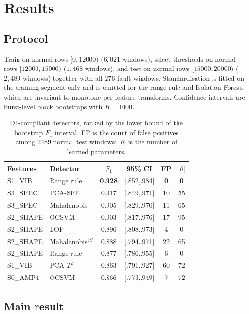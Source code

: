\documentclass[twocolumn,10pt]{article}
\begin{document}
\section{Results}
\label{sec:results}

\subsection{Protocol}

Train on normal rows $[0,12000)$ ($6{,}021$ windows), select thresholds on
normal rows $[12000,15000)$ ($1{,}468$ windows), and test on normal rows
$[15000,20000)$ ($2{,}489$ windows) together with all $276$ fault windows.
Standardisation is fitted on the training segment only and is omitted for the
range rule and Isolation Forest, which are invariant to monotone per-feature
transforms. Confidence intervals are burst-level block bootstraps with
$B=1000$.

\begin{table}[t]
\centering\small
\caption{D1-compliant detectors, ranked by the lower bound of the bootstrap
$F_1$ interval. FP is the count of false positives among $2489$ normal test
windows; $|\theta|$ is the number of learned parameters.}
\label{tab:main}
\begin{tabular}{llcccc}
\toprule
Features & Detector & $F_1$ & 95\% CI & FP & $|\theta|$ \\
\midrule
\textsf{S1\_VIB} & Range rule & \textbf{0.928} & [.852,.984] & \textbf{0} & \textbf{0} \\
\textsf{S3\_SPEC} & PCA-SPE & 0.917 & [.849,.971] & 10 & 55 \\
\textsf{S3\_SPEC} & Mahalanobis & 0.905 & [.829,.970] & 11 & 65 \\
\textsf{S2\_SHAPE} & OCSVM & 0.903 & [.817,.976] & 17 & 95 \\
\textsf{S2\_SHAPE} & LOF & 0.896 & [.808,.973] & 4 & 0 \\
\textsf{S2\_SHAPE} & Mahalanobis$^{1S}$ & 0.888 & [.794,.971] & 22 & 65 \\
\textsf{S2\_SHAPE} & Range rule & 0.877 & [.786,.955] & 6 & 0 \\
\textsf{S1\_VIB} & PCA-$T^2$ & 0.863 & [.791,.927] & 60 & 72 \\
\textsf{S0\_AMP4} & OCSVM & 0.866 & [.773,.949] & 7 & 72 \\
\bottomrule
\end{tabular}
\end{table}

\subsection{Main result}
\end{document}
